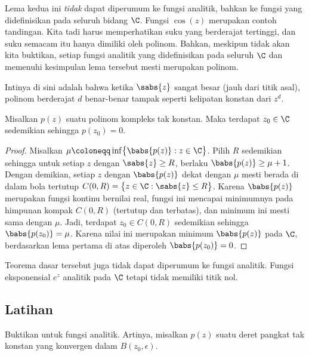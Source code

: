 Lema kedua ini \emph{tidak} dapat diperumum ke fungsi
analitik, bahkan ke fungsi yang didefinisikan pada seluruh bidang $\C$.  Fungsi
$\cos(z)$ merupakan contoh tandingan.
Kita tadi harus memperhatikan
suku yang berderajat tertinggi, dan suku semacam itu hanya dimiliki oleh
polinom.  Bahkan, meskipun tidak akan kita buktikan, setiap fungsi analitik
yang didefinisikan pada seluruh $\C$ dan memenuhi kesimpulan lema tersebut
mesti merupakan polinom.

Intinya di sini adalah bahwa ketika $\sabs{z}$ sangat besar (jauh dari
titik asal), polinom berderajat $d$ benar-benar tampak seperti kelipatan konstan
dari $z^d$.

\begin{thm}
%
Misalkan $p(z)$ suatu polinom kompleks tak konstan.  Maka terdapat $z_0 \in \C$
sedemikian sehingga $p(z_0) = 0$.
\end{thm}

\begin{proof}
Misalkan $\mu \coloneqq \inf \bigl\{ \babs{p(z)} : z \in \C \bigr\}$.  Pilih $R$ sedemikian sehingga
untuk setiap $z$ dengan $\sabs{z} \geq R$, berlaku $\babs{p(z)} \geq \mu+1$.
Dengan demikian, setiap $z$ dengan $\babs{p(z)}$ dekat dengan $\mu$ mesti berada di dalam
bola tertutup $C(0,R) = \bigl\{ z \in \C : \sabs{z} \leq R \bigr\}$.  Karena $\babs{p(z)}$
merupakan fungsi kontinu bernilai real, fungsi ini mencapai minimumnya
pada himpunan kompak $C(0,R)$ (tertutup dan terbatas), dan minimum ini mesti
sama dengan $\mu$.  Jadi, terdapat $z_0 \in C(0,R)$ sedemikian sehingga $\babs{p(z_0)} = \mu$.
Karena nilai ini merupakan minimum $\babs{p(z)}$ pada $\C$, berdasarkan lema pertama
di atas diperoleh $\babs{p(z_0)} = 0$.
\end{proof}

Teorema dasar tersebut juga tidak dapat diperumum ke fungsi analitik.  Fungsi
eksponensial $e^{z}$ analitik pada $\C$ tetapi tidak memiliki titik nol.

\subsection{Latihan}

\begin{exercise} \label{exercise:minprinciple}
Buktikan  untuk fungsi analitik.  Artinya,
misalkan $p(z)$ suatu deret pangkat tak konstan yang konvergen dalam
$B(z_0,\epsilon)$.
\end{exercise}

